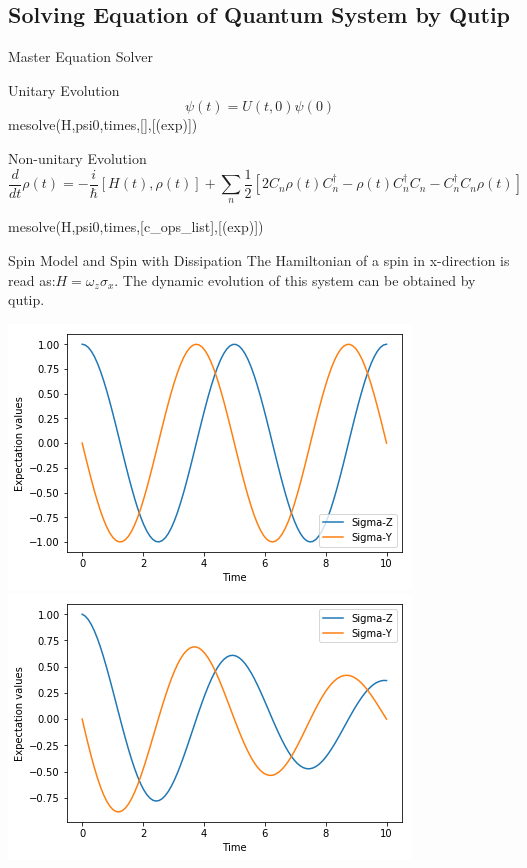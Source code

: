\documentclass{beamer}
\begin{document}
\subsection{Solving Equation of Quantum System by Qutip}
\begin{frame}{Master Equation Solver}
\begin{block}{Unitary Evolution}
	\[\psi \left( t \right) = U\left( {t,0} \right)\psi \left( 0 \right)\]
	mesolve(H,psi0,times,[],[(exp)])
\end{block}
\begin{block}{Non-unitary Evolution}
\[\frac{d}{{dt}}\rho \left( t \right) =  - \frac{i}{\hbar }\left[ {H\left( t \right),\rho \left( t \right)} \right] + \sum\limits_n {\frac{1}{2}\left[ {2{C_n}\rho \left( t \right)C_n^\dag  - \rho \left( t \right)C_n^\dag {C_n} - C_n^\dag {C_n}\rho \left( t \right)} \right]} \]

mesolve(H,psi0,times,[c\_ops\_list],[(exp)])
\end{block}

\end{frame}
\begin{frame}{Spin Model and Spin with Dissipation}
The Hamiltonian of a spin in x-direction is read as:$H = {\omega _z}{\sigma _x}$. The dynamic evolution of this system can be obtained by qutip.

\includegraphics[width=0.5\linewidth]{2}
\includegraphics[width=0.5\linewidth]{3}


\end{frame}
\end{document}
